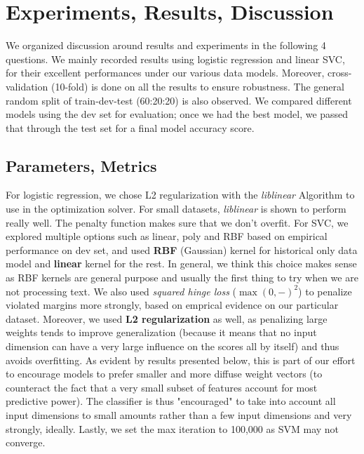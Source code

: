 \documentclass[paper=a4, fontsize=10pt]{scrartcl} %
\numberwithin{equation}{section} %
\numberwithin{figure}{section} %
\numberwithin{table}{section} %
\begin{document}

\section{Experiments, Results, Discussion}
We organized discussion around results and experiments in the following 4 questions. We mainly recorded results using logistic regression and linear SVC, for their excellent performances under our various data models. Moreover, cross-validation (10-fold) is done on all the results to ensure robustness. The general random split of train-dev-test (60:20:20) is also observed. We compared different models using the dev set for evaluation; once we had the best model, we passed that through the test set for a final model accuracy score. 
\subsection{Parameters, Metrics}
For logistic regression, we chose L2 regularization with the \textit{liblinear} Algorithm \cite{hsieh2008dual} to use in the optimization solver. For small datasets, \textit{liblinear} is shown to perform really well. The penalty function makes sure that we don't overfit. 
For SVC, we explored multiple options such as linear, poly and RBF based on empirical performance on dev set, and used \textbf{RBF} (Gaussian) kernel for historical only data model and \textbf{linear} kernel for the rest. In general, we think this choice makes sense as RBF kernels are general purpose and usually the first thing to try when we are not processing text. We also used \textit{squared hinge loss} ($\max(0,-)^2$) to penalize violated margins more strongly, based on emprical evidence on our particular dataset. Moreover, we used \textbf{L2 regularization} as well, as penalizing large weights tends to improve generalization (because it means that no input dimension can have a very large influence on the scores all by itself) and thus avoids overfitting. As evident by results presented below, this is part of our effort to encourage models to prefer smaller and more diffuse weight vectors (to counteract the fact that a very small subset of features account for most predictive power). The classifier is thus "encouraged" to take into account all input dimensions to small amounts rather than a few input dimensions and very strongly, ideally. Lastly, we set the max iteration to 100,000 as SVM may not converge. 
\end{document}
